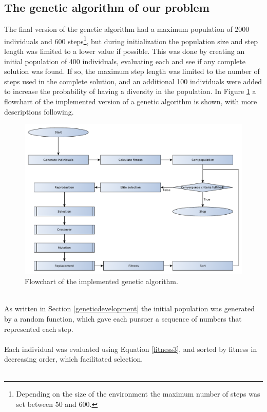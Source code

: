 \subsection{The genetic algorithm of our problem}\label{geneticourproblem}
The final version of the genetic algorithm had a maximum population of 2000 individuals and 600 steps\footnote{Depending on the size of the environment the maximum number of steps was set between 50 and 600.}, but during initialization the population size and step length was limited to a lower value if possible. This was done by creating an initial population of 400 individuals, evaluating each and see if any complete solution was found. If so, the maximum step length was limited to the number of steps used in the complete solution, and an additional 100 individuals were added to increase the probability of having a diversity in the population. In Figure \ref{GeneticFlowChart-algorithm} a flowchart of the implemented version of a genetic algorithm is shown, with more descriptions following.
\begin{figure}[!h]
	\centering
	\includegraphics[width=\textwidth]{chapter_4_methods/GeneticFlowChart-Algorithm}
	\caption[Flowchart of the implemented genetic algorithm]
	{Flowchart of the implemented genetic algorithm.}
	\label{GeneticFlowChart-algorithm}
\end{figure}
\\As written in Section \ref{geneticdevelopment} the initial population was generated by a random function, which gave each pursuer a sequence of numbers that represented each step.\\\\
Each individual was evaluated using Equation \eqref{fitness3}, and sorted by fitness in decreasing order, which facilitated selection.\\\\
